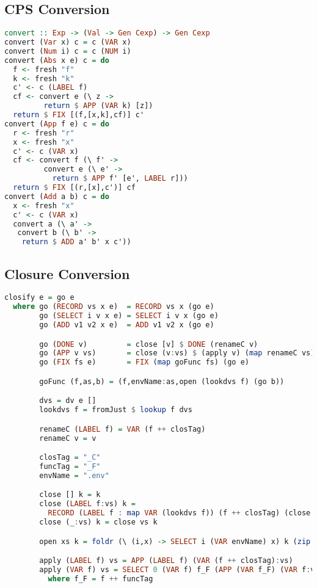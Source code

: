 \subsection{\label{subsection:cpsconvert}CPS Conversion}
\begin{lstlisting}[language=Haskell]
convert :: Exp -> (Val -> Gen Cexp) -> Gen Cexp
convert (Var x) c = c (VAR x)
convert (Num i) c = c (NUM i)
convert (Abs x e) c = do
  f <- fresh "f"
  k <- fresh "k"
  c' <- c (LABEL f)
  cf <- convert e (\ z ->
         return $ APP (VAR k) [z])
  return $ FIX [(f,[x,k],cf)] c'
convert (App f e) c = do
  r <- fresh "r"
  x <- fresh "x"
  c' <- c (VAR x)
  cf <- convert f (\ f' ->
         convert e (\ e' ->
           return $ APP f' [e', LABEL r]))
  return $ FIX [(r,[x],c')] cf
convert (Add a b) c = do
  x <- fresh "x"
  c' <- c (VAR x)
  convert a (\ a' ->
   convert b (\ b' ->
    return $ ADD a' b' x c'))
\end{lstlisting}

\subsection{\label{section:closconvert}Closure Conversion}
\begin{lstlisting}[language=Haskell]
closify e = go e
  where go (RECORD vs x e)  = RECORD vs x (go e)
        go (SELECT i v x e) = SELECT i v x (go e)
        go (ADD v1 v2 x e)  = ADD v1 v2 x (go e)

        go (DONE v)         = close [v] $ DONE (renameC v)
        go (APP v vs)       = close (v:vs) $ (apply v) (map renameC vs)
        go (FIX fs e)       = FIX (map goFunc fs) (go e)

        goFunc (f,as,b) = (f,envName:as,open (lookdvs f) (go b))

        dvs = dv e []
        lookdvs f = fromJust $ lookup f dvs

        renameC (LABEL f) = VAR (f ++ closTag)
        renameC v = v

        closTag = "_C"
        funcTag = "_F"
        envName = ".env"

        close [] k = k
        close (LABEL f:vs) k = 
          RECORD (LABEL f : map VAR (lookdvs f)) (f ++ closTag) (close vs k)
        close (_:vs) k = close vs k

        open xs k = foldr (\ (i,x) -> SELECT i (VAR envName) x) k (zip [1..] xs)

        apply (LABEL f) vs = APP (LABEL f) (VAR (f ++ closTag):vs)
        apply (VAR f) vs = SELECT 0 (VAR f) f_F (APP (VAR f_F) (VAR f:vs))
          where f_F = f ++ funcTag
\end{lstlisting}
